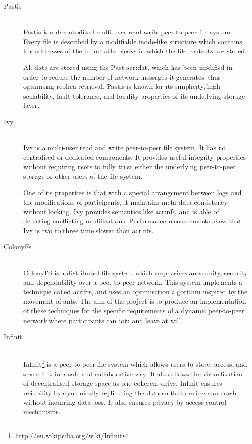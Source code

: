 \begin{description}
	\item[Pastis]\-\\
	Pastis \cite{Busca:2005gt} is a decentralised multi-user read-write peer-to-peer file system. Every file is described by
a modifiable inode-like structure which contains the addresses of the immutable blocks in which the file contents are stored.

All data are stored using the Past \gls{acr:dht}, which has been modified in order to reduce the number of network messages it generates, thus optimising replica retrieval. Pastis is known for its simplicity, high scalability, fault tolerance, and locality properties of its underlying storage layer.
	\item[Ivy]\-\\
	Ivy \cite{Muthitacharoen:2002iv} is a multi-user read and write peer-to-peer file system. It has no centralised or dedicated components. It provides useful integrity properties without requiring users to fully trust either the underlying peer-to-peer storage or other users of the file system.
	
	One of its properties is that with a special arrangement between logs and the modifications of participants, it maintains meta-data consistency without locking. Ivy provides semantics like \gls{acr:nfs}, and is able of detecting conflicting modifications. Performance measurements show that Ivy is two to three time slower than \gls{acr:nfs}.
	\item[ColonyFs]\-\\
	ColonyFS \cite{Colony:2009fs} is a distributed file system which emphasises anonymity, security and dependability over a peer to peer network. This system implements a technique called \gls{acr:frs}, and uses an optimisation algorithm inspired by the movement of ants. The aim of the project is to produce an implementation of these techniques for the specific requirements of a dynamic peer-to-peer network where participants can join and leave at will.
	\item[Infinit]\-\\
	Infinit\footnote{http://en.wikipedia.org/wiki/Infinit} is a peer-to-peer file system which allows users to store, access, and share files in a safe and collaborative way. It also allows the virtualisation of decentralised storage space as one coherent drive. Infinit ensures reliability by dynamically replicating the data so that devices can crash without incurring data loss. It also ensures privacy by access control mechanisms.
	

\end{description}
